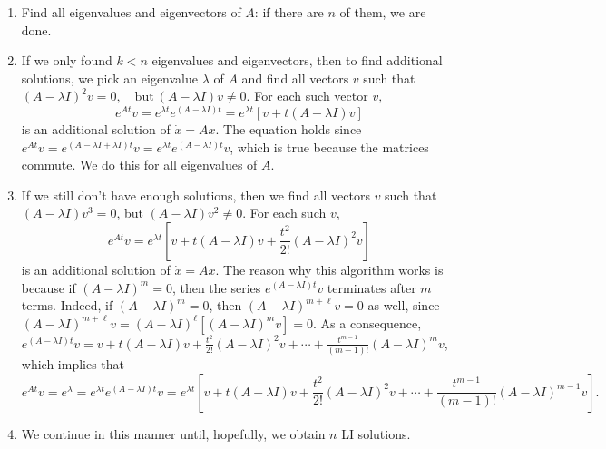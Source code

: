     \begin{enumerate}[label=(\arabic*)] 
        \item Find all eigenvalues and eigenvectors of $A$: if there are $n$ of them, we are done.
        \item If we only found $k<n$ eigenvalues and eigenvectors, then to find additional solutions, we pick an eigenvalue $\lambda$ of $A$ and find all vectors $v$ such that $(A-\lambda I)^2v=0,\quad \text{but} \ (A-\lambda I)v\neq 0.$ For each such vector $v,$ \[
                e^{At}v=e^{\lambda t}e^{(A-\lambda I)t}=e^{\lambda t}\left[ v+t(A-\lambda I)v \right] 
            \] is an additional solution of $\dot x=Ax$. The equation holds since $e^{At}v=e^{(A-\lambda I + \lambda I)t}v=e^{\lambda t}e^{(A-\lambda I)t}v$, which is true because the matrices commute. We do this for all eigenvalues of $A$.
        \item If we still don't have enough solutions, then we find all vectors $v$ such that $(A-\lambda I)v^3=0$, but $(A-\lambda I)v^2\neq 0$. For each such $v$,\[
                e^{At}v=e^{\lambda t}\left[ v+t(A-\lambda I)v+ \frac{t^2}{2!}(A-\lambda I)^2v \right] 
            \] is an additional solution of $\dot x=Ax$. The reason why this algorithm works is because if $(A-\lambda I)^m=0$, then the series $e^{(A-\lambda I)t}v$ terminates after $m$ terms. Indeed, if $(A-\lambda I)^m=0$, then $(A-\lambda I)^{m+\ell}v=0$ as well, since $(A-\lambda I)^{m+\ell}v=(A-\lambda I)^{\ell}\left[ (A-\lambda I)^mv \right] =0$. As a consequence, $e^{(A-\lambda I)t}v=v+t(A-\lambda I)v+\frac{t^2}{2!}(A-\lambda I)^2v+\cdots + \frac{t ^{m-1}}{(m-1)!}(A-\lambda I)^m v$, which implies that \[
            e^{At}v=e^{\lambda}=e^{\lambda t}e^{(A-\lambda I)t}v=e^{\lambda t}\left[ v+t(A-\lambda I)v +\frac{t^2}{2!}(A-\lambda I)^2v+\cdots + \frac{t^{m-1}}{(m-1)!}(A-\lambda I)^{m-1}v \right] .
            \] 
    \item We continue in this manner until, hopefully, we obtain $n$ LI solutions.
    \end{enumerate}

